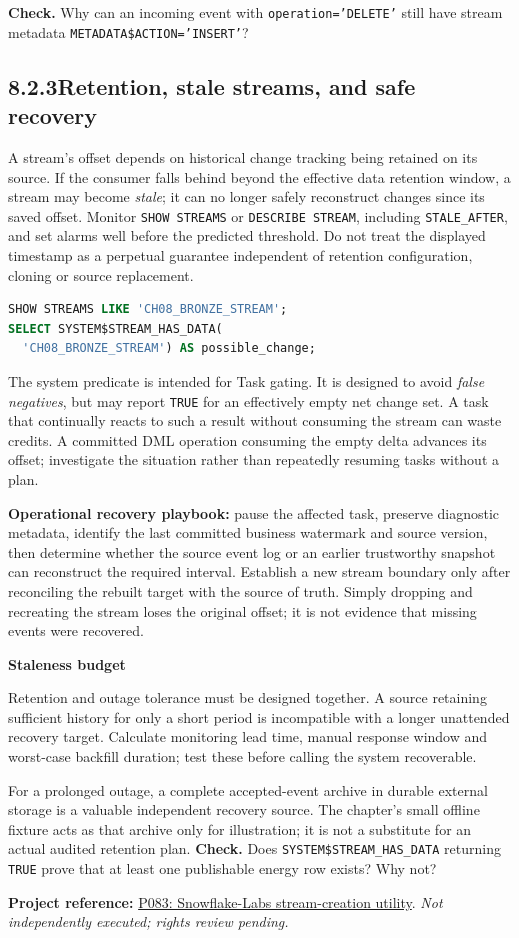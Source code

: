 \documentclass[11pt,twoside]{article}
\newcommand{\topic}[2]{\subsection*{#1\quad #2}}
\newcommand{\repo}[2]{\par\begingroup\fontsize{8.0}{9.6}\selectfont\sffamily\color{inkgray}\textbf{Project reference:} \href{#2}{#1}. \textit{Not independently executed; rights review pending.}\par\endgroup}
\begin{document}
\textbf{Check.} Why can an incoming event with \texttt{operation='DELETE'} still have stream metadata \texttt{METADATA\$ACTION='INSERT'}?
\newpage
\topic{8.2.3}{Retention, stale streams, and safe recovery}
A stream's offset depends on historical change tracking being retained on its source. If the consumer falls behind beyond the effective data retention window, a stream may become \emph{stale}; it can no longer safely reconstruct changes since its saved offset. Monitor \texttt{SHOW STREAMS} or \texttt{DESCRIBE STREAM}, including \texttt{STALE\_AFTER}, and set alarms well before the predicted threshold. Do not treat the displayed timestamp as a perpetual guarantee independent of retention configuration, cloning or source replacement.
\begin{lstlisting}[language=SQL,caption={Inspect stream status and potential staleness.}]
SHOW STREAMS LIKE 'CH08_BRONZE_STREAM';
SELECT SYSTEM$STREAM_HAS_DATA(
  'CH08_BRONZE_STREAM') AS possible_change;
\end{lstlisting}
The system predicate is intended for Task gating. It is designed to avoid \emph{false negatives}, but may report \texttt{TRUE} for an effectively empty net change set. A task that continually reacts to such a result without consuming the stream can waste credits. A committed DML operation consuming the empty delta advances its offset; investigate the situation rather than repeatedly resuming tasks without a plan.

\textbf{Operational recovery playbook:} pause the affected task, preserve diagnostic metadata, identify the last committed business watermark and source version, then determine whether the source event log or an earlier trustworthy snapshot can reconstruct the required interval. Establish a new stream boundary only after reconciling the rebuilt target with the source of truth. Simply dropping and recreating the stream loses the original offset; it is not evidence that missing events were recovered.

\begin{insight}\textbf{Staleness budget}\par
Retention and outage tolerance must be designed together. A source retaining sufficient history for only a short period is incompatible with a longer unattended recovery target. Calculate monitoring lead time, manual response window and worst-case backfill duration; test these before calling the system recoverable.\end{insight}
For a prolonged outage, a complete accepted-event archive in durable external storage is a valuable independent recovery source. The chapter's small offline fixture acts as that archive only for illustration; it is not a substitute for an actual audited retention plan.
\textbf{Check.} Does \texttt{SYSTEM\$STREAM\_HAS\_DATA} returning \texttt{TRUE} prove that at least one publishable energy row exists? Why not?
\repo{P083: Snowflake-Labs stream-creation utility}{https://github.com/Snowflake-Labs/sproc-to-create-streams}
\newpage
\end{document}
